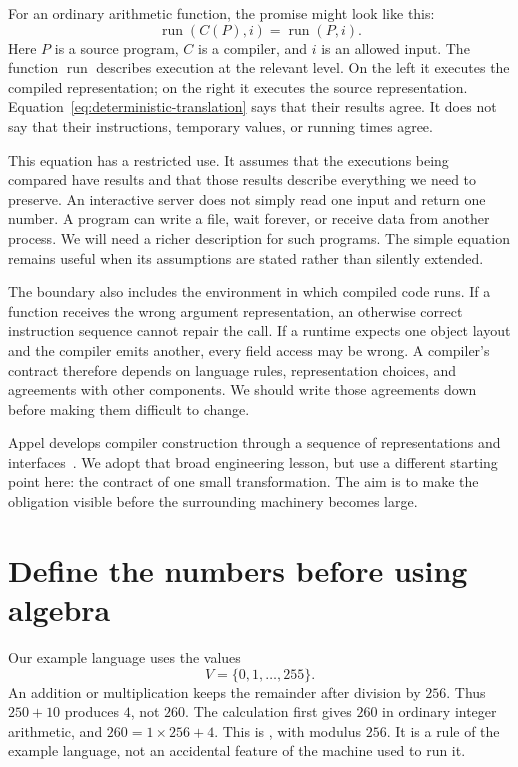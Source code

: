 For an ordinary arithmetic function, the promise might look like this:
\begin{equation}
  \operatorname{run}(C(P),i)=\operatorname{run}(P,i).
  \label{eq:deterministic-translation}
\end{equation}
Here $P$ is a source program, $C$ is a compiler, and $i$ is an allowed input.
The function $\operatorname{run}$ describes execution at the relevant level.
On the left it executes the compiled representation; on the right it executes the source representation.
Equation~\ref{eq:deterministic-translation} says that their results agree.
It does not say that their instructions, temporary values, or running times agree.

This equation has a restricted use.
It assumes that the executions being compared have results and that those results describe everything we need to preserve.
An interactive server does not simply read one input and return one number.
A program can write a file, wait forever, or receive data from another process.
We will need a richer description for such programs.
The simple equation remains useful when its assumptions are stated rather than silently extended.

The boundary also includes the environment in which compiled code runs.
If a function receives the wrong argument representation, an otherwise correct instruction sequence cannot repair the call.
If a runtime expects one object layout and the compiler emits another, every field access may be wrong.
A compiler's contract therefore depends on language rules, representation choices, and agreements with other components.
We should write those agreements down before making them difficult to change.

Appel develops compiler construction through a sequence of representations and interfaces~\cite{appel-1998-modern}.
We adopt that broad engineering lesson, but use a different starting point here: the contract of one small transformation.
The aim is to make the obligation visible before the surrounding machinery becomes large.

\section{Define the numbers before using algebra}
\label{sec:tiny-expression-domain}

Our example language uses the values
\[
  V=\{0,1,\ldots,255\}.
\]
An addition or multiplication keeps the remainder after division by $256$.
Thus $250+10$ produces $4$, not $260$.
The calculation first gives $260$ in ordinary integer arithmetic, and $260=1\times256+4$.
This is , with modulus $256$.
It is a rule of the example language, not an accidental feature of the machine used to run it.

